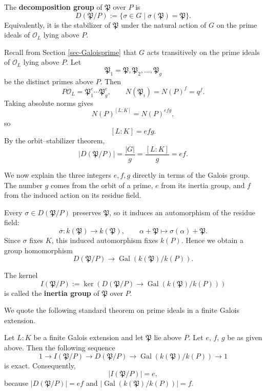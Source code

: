 \begin{definition}
The {\bf decomposition group} of $\mathfrak P$ over $P$ is
\[
D(\mathfrak P/P):=\{\sigma\in G\mid \sigma(\mathfrak P)=\mathfrak P\}.
\]
Equivalently, it is the stabilizer of $\mathfrak P$ under the natural action of $G$ on the
prime ideals of $\mathcal O_L$ lying above $P$.
\end{definition}

Recall from Section \ref{sec-Galoisprime} that $G$ acts transitively on the prime ideals
of $\mathcal O_L$ lying above $P$. Let
\[
\mathfrak P_1=\mathfrak P,\mathfrak P_2,\dots,\mathfrak P_g
\]
be the distinct primes above $P$. Then
\[
P\mathcal O_L=\mathfrak P_1^e\cdots\mathfrak P_g^e,
\qquad
N(\mathfrak P_i)=N(P)^f = q^f.
\]
Taking absolute norms gives
\[
N(P)^{[L:K]}=N(P)^{efg},
\]
so
\[
\boxed{[L:K]=efg.}
\]
By the orbit--stabilizer theorem,
\[
|D(\mathfrak P/P)|=\frac{|G|}{g}=\frac{[L:K]}{g}=ef.
\]

We now explain the three integers $e,f,g$ directly in terms of the Galois group. The number $g$ comes from the orbit of a prime, $e$ from its inertia group, and $f$ from the induced action on its residue field.

Every $\sigma\in D(\mathfrak P/P)$ preserves $\mathfrak P$, so it induces an automorphism
of the residue field:
\[
\overline\sigma:k(\mathfrak P)\longrightarrow k(\mathfrak P),
\qquad
\alpha+\mathfrak P\longmapsto \sigma(\alpha)+\mathfrak P.
\]
Since $\sigma$ fixes $K$, this induced automorphism fixes $k(P)$. Hence we obtain a group
homomorphism
\[
D(\mathfrak P/P)\longrightarrow \operatorname{Gal}(k(\mathfrak P)/k(P)).
\]

\begin{definition}
The kernel
\[
I(\mathfrak P/P):=\ker\left(D(\mathfrak P/P)
\longrightarrow \operatorname{Gal}(k(\mathfrak P)/k(P))\right)
\]
is called the {\bf inertia group} of $\mathfrak P$ over $P$.
\end{definition}

We quote the following standard theorem on prime ideals in a finite Galois extension.

\begin{theorem}\label{thm-efg}
Let $L:K$ be a finite Galois extension and let $\mathfrak P$ lie above $P$. Let $e$, $f$, $g$ be as given above. Then the following sequence
\[
1\longrightarrow I(\mathfrak P/P)
\longrightarrow D(\mathfrak P/P)
\longrightarrow \operatorname{Gal}(k(\mathfrak P)/k(P))
\longrightarrow 1
\]
is exact. Consequently,
\[
|I(\mathfrak P/P)|=e,
\]
because $|D(\mathfrak P/P)|=ef$ and
$|\operatorname{Gal}(k(\mathfrak P)/k(P))|=f$. 
\end{theorem}

